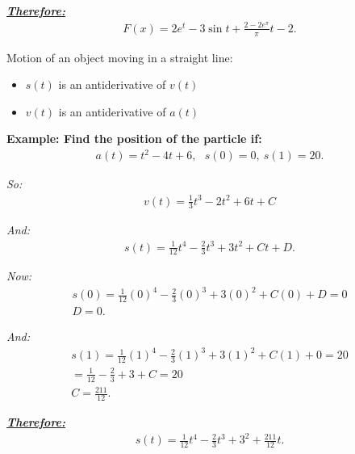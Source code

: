 \documentclass{report}
\begin{document}
  \bigbreak \noindent 
  \textbf{\textit{\underline{Therefore:}}}
  \begin{align*}
    F(x) = 2e^{t} -3\sin{t} + \frac{2-2e^{\pi}}{\pi}t -2
  .\end{align*}

  \bigbreak \noindent \bigbreak \noindent 
  \begin{mdframed}
    Motion of an object moving in a straight line:
    \begin{itemize}
      \item $s(t)$ is an antiderivative of $v(t)$
      \item $v(t)$ is an antiderivative of $a(t)$
    \end{itemize}
  \end{mdframed}

  \bigbreak \noindent 
  \begin{mdframed}
    \textbf{Example: Find the position of the particle if:}
       \begin{align*}
         a(t) = t^{2}-4t+6, \ \ \ s(0) = 0,\ s(1) = 20
       .\end{align*} 
  \end{mdframed}

  \bigbreak \noindent
  \textit{So:}
  \begin{align*}
    v(t) = \frac{1}{3}t^{3}-2t^{2}+6t + C
  \end{align*}

  \bigbreak \noindent 
  \textit{And:}
  \begin{align*}
    s(t) = \frac{1}{12}t^{4}-\frac{2}{3}t^{3}+3t^{2}+Ct+D
  .\end{align*}

  \bigbreak \noindent 
  \textit{Now:}
  \begin{align*}
    s(0) = \frac{1}{12}(0)^{4}-\frac{2}{3}(0)^{3}+3(0)^{2}+C(0) + D  = 0 \\
    D = 0
  .\end{align*}

  \bigbreak \noindent 
  \textit{And:}
  \begin{align*}
    s(1) = \frac{1}{12}(1)^{4} - \frac{2}{3}(1)^{3}+3(1)^{2} + C(1) + 0 = 20 \\
    = \frac{1}{12}-\frac{2}{3}+3 +  C = 20 \\
    C = \frac{211}{12}
  .\end{align*}

  \bigbreak \noindent 
  \textbf{\textit{\underline{Therefore:}}}
  \begin{align*}
    \boxed{s(t) = \frac{1}{12}t^{4} -\frac{2}{3}t^{3} + 3^{2} + \frac{211}{12}t}
  .\end{align*}
\end{document}
